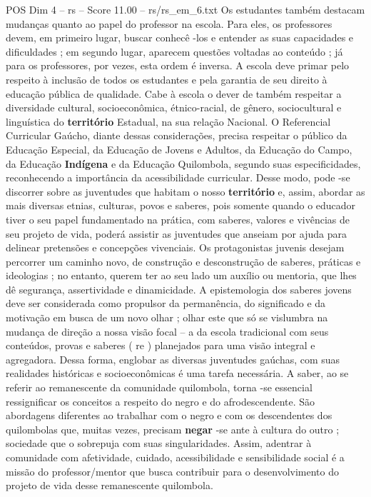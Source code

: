 \begin{textsample}{POS Dim 4 – rs – Score 11.00 – rs/rs\_em\_6.txt}
Os estudantes também destacam mudanças quanto ao papel do professor na escola.
Para eles, os professores devem, em primeiro lugar, buscar conhecê -los e entender as suas capacidades e dificuldades ; em segundo lugar, aparecem questões voltadas ao conteúdo ; já para os professores, por vezes, esta ordem é inversa.
A escola deve primar pelo respeito à inclusão de todos os estudantes e pela garantia de seu direito à educação pública de qualidade.
Cabe à escola o dever de também respeitar a diversidade cultural, socioeconômica, étnico-racial, de gênero, sociocultural e linguística do \textbf{território} Estadual, na sua relação Nacional.
O Referencial Curricular Gaúcho, diante dessas considerações, precisa respeitar o público da Educação Especial, da Educação de Jovens e Adultos, da Educação do Campo, da Educação \textbf{Indígena} e da Educação Quilombola, segundo suas especificidades, reconhecendo a importância da acessibilidade curricular.
Desse modo, pode -se discorrer sobre as juventudes que habitam o nosso \textbf{território} e, assim, abordar as mais diversas etnias, culturas, povos e saberes, pois somente quando o educador tiver o seu papel fundamentado na prática, com saberes, valores e vivências de seu projeto de vida, poderá assistir as juventudes que anseiam por ajuda para delinear pretensões e concepções vivenciais.
Os protagonistas juvenis desejam percorrer um caminho novo, de construção e desconstrução de saberes, práticas e ideologias ; no entanto, querem ter ao seu lado um auxílio ou mentoria, que lhes dê segurança, assertividade e dinamicidade.
A epistemologia dos saberes jovens deve ser considerada como propulsor da permanência, do significado e da motivação em busca de um novo olhar ; olhar este que só se vislumbra na mudança de direção a nossa visão focal – a da escola tradicional com seus conteúdos, provas e saberes ( re ) planejados para uma visão integral e agregadora.
Dessa forma, englobar as diversas juventudes gaúchas, com suas realidades históricas e socioeconômicas é uma tarefa necessária.
A saber, ao se referir ao remanescente da comunidade quilombola, torna -se essencial ressignificar os conceitos a respeito do negro e do afrodescendente.
São abordagens diferentes ao trabalhar com o negro e com os descendentes dos quilombolas que, muitas vezes, precisam \textbf{negar} -se ante à cultura do outro ; sociedade que o sobrepuja com suas singularidades.
Assim, adentrar à comunidade com afetividade, cuidado, acessibilidade e sensibilidade social é a missão do professor/mentor que busca contribuir para o desenvolvimento do projeto de vida desse remanescente quilombola.

\end{textsample}
